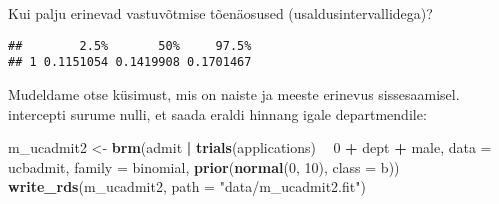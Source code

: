 \documentclass[]{article}
\newenvironment{Shaded}{\begin{snugshade}}{\end{snugshade}}
\newcommand{\KeywordTok}[1]{\textcolor[rgb]{0.13,0.29,0.53}{\textbf{#1}}}
\newcommand{\DataTypeTok}[1]{\textcolor[rgb]{0.13,0.29,0.53}{#1}}
\newcommand{\DecValTok}[1]{\textcolor[rgb]{0.00,0.00,0.81}{#1}}
\newcommand{\StringTok}[1]{\textcolor[rgb]{0.31,0.60,0.02}{#1}}
\newcommand{\OperatorTok}[1]{\textcolor[rgb]{0.81,0.36,0.00}{\textbf{#1}}}
\newcommand{\NormalTok}[1]{#1}
\begin{document}
Kui palju erinevad vastuvõtmise tõenäosused (usaldusintervallidega)?

\begin{Shaded}
\end{Shaded}

\begin{verbatim}
##        2.5%       50%     97.5%
## 1 0.1151054 0.1419908 0.1701467
\end{verbatim}

Mudeldame otse küsimust, mis on naiste ja meeste erinevus sissesaamisel.
intercepti surume nulli, et saada eraldi hinnang igale departmendile:

\begin{Shaded}
\begin{Highlighting}[]
\NormalTok{m_ucadmit2 <-}\StringTok{ }\KeywordTok{brm}\NormalTok{(admit }\OperatorTok{|}\StringTok{ }\KeywordTok{trials}\NormalTok{(applications) }\OperatorTok{~}\StringTok{ }\DecValTok{0} \OperatorTok{+}\StringTok{ }\NormalTok{dept }\OperatorTok{+}\StringTok{ }\NormalTok{male,}
                  \DataTypeTok{data =}\NormalTok{ ucbadmit, }
                  \DataTypeTok{family =}\NormalTok{ binomial,}
                  \KeywordTok{prior}\NormalTok{(}\KeywordTok{normal}\NormalTok{(}\DecValTok{0}\NormalTok{, }\DecValTok{10}\NormalTok{), }\DataTypeTok{class =}\NormalTok{ b))}
\KeywordTok{write_rds}\NormalTok{(m_ucadmit2, }\DataTypeTok{path =} \StringTok{"data/m_ucadmit2.fit"}\NormalTok{)}
\end{Highlighting}
\end{Shaded}
\end{document}
